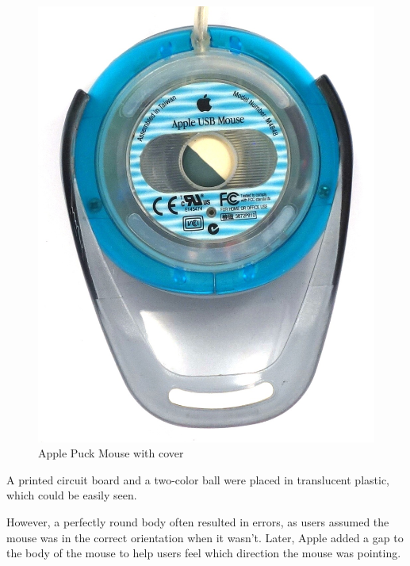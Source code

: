 \documentclass[11pt, a4paper]{article}
\begin{document}
\begin{figure}[h]
    \includegraphics[scale=0.45]{1998_apple_puck/appledown63.JPG}
    \caption{Apple Puck Mouse with cover}
    \label{fig:addon}
\end{figure}

A printed circuit board and a two-color ball were placed in translucent plastic, which could be easily seen.

However, a perfectly round body often resulted in errors, as users assumed the mouse was in the correct orientation when it wasn't. Later, Apple added a gap to the body of the mouse to help users feel which direction the mouse was pointing.
\end{document}
